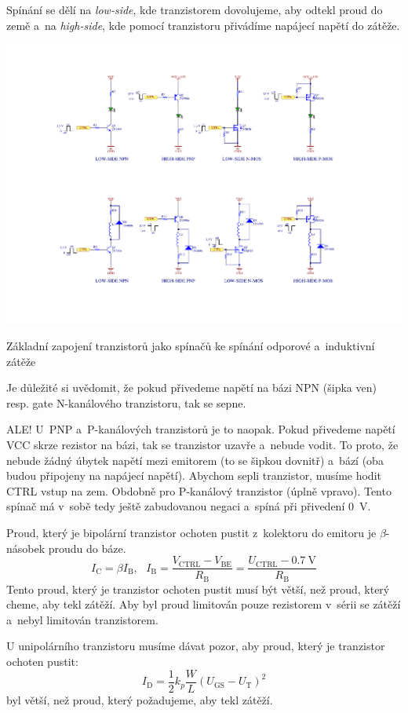 \documentclass[a4paper,12pt]{article}   %
\begin{document}
Spínání se dělí na \textit{low-side}, kde tranzistorem dovolujeme, aby odtekl proud do země a~na \textit{high-side}, kde pomocí tranzistoru přivádíme napájecí napětí do zátěže.

\begin{schema}[h!]
    \centering
    \includegraphics[width=.9\textwidth]{tranzistory-spinace2.pdf}
    \caption{Základní zapojení tranzistorů jako spínačů ke spínání odporové a~induktivní zátěže}
\end{schema}
Je důležité si uvědomit, že pokud přivedeme napětí na bázi NPN (šipka ven) resp. gate N-kanálového tranzistoru, tak se sepne. 

ALE! U~PNP a~P-kanálových tranzistorů je to naopak. Pokud přivedeme napětí VCC skrze rezistor na bázi, tak se tranzistor uzavře a~nebude vodit. To proto, že nebude žádný úbytek napětí mezi emitorem (to se šipkou dovnitř) a~bází (oba budou připojeny na napájecí napětí). Abychom sepli tranzistor, musíme hodit CTRL vstup na zem. Obdobně pro P-kanálový tranzistor (úplně vpravo). Tento spínač má v~sobě tedy ještě zabudovanou negaci a~spíná při přivedení 0~V.

Proud, který je bipolární tranzistor ochoten pustit z~kolektoru do emitoru je $\beta$-násobek proudu do báze.
\begin{equation*}
    I_\text{C} = \beta I_\text{B}, ~~~I_\text{B} = \frac{V_\text{CTRL} - V_\text{BE}}{R_\text{B}} = \frac{U_\text{CTRL} - 0.7~\text{V}}{R_\text{B}}
\end{equation*}
Tento proud, který je tranzistor ochoten pustit musí být větší, než proud, který cheme, aby tekl zátěží. Aby byl proud limitován pouze rezistorem v~sérii se zátěží a~nebyl limitován tranzistorem.

U unipolárního tranzistoru musíme dávat pozor, aby proud, který je tranzistor ochoten pustit:
\begin{equation*}
    I_\text{D} = \frac{1}{2}k_p \frac{W}{L} (U_\text{GS} - U_\text{T})^2
\end{equation*}
byl větší, než proud, který požadujeme, aby tekl zátěží.
\end{document}
